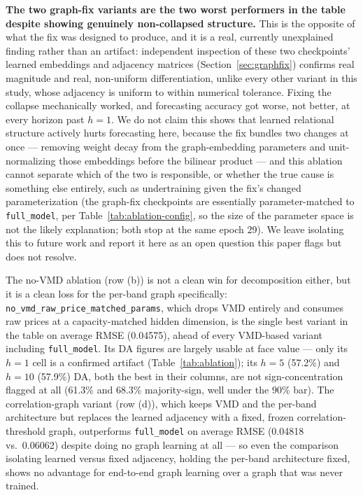 \documentclass[journal]{IEEEtran}
\begin{document}
\textbf{The two graph-fix variants are the two worst performers in the table despite showing genuinely non-collapsed structure.} This is the opposite of what the fix was designed to produce, and it is a real, currently unexplained finding rather than an artifact: independent inspection of these two checkpoints' learned embeddings and adjacency matrices (Section~\ref{sec:graphfix}) confirms real magnitude and real, non-uniform differentiation, unlike every other variant in this study, whose adjacency is uniform to within numerical tolerance. Fixing the collapse mechanically worked, and forecasting accuracy got worse, not better, at every horizon past $h=1$. We do not claim this shows that learned relational structure actively hurts forecasting here, because the fix bundles two changes at once --- removing weight decay from the graph-embedding parameters and unit-normalizing those embeddings before the bilinear product --- and this ablation cannot separate which of the two is responsible, or whether the true cause is something else entirely, such as undertraining given the fix's changed parameterization (the graph-fix checkpoints are essentially parameter-matched to \texttt{full\_model}, per Table~\ref{tab:ablation-config}, so the size of the parameter space is not the likely explanation; both stop at the same epoch 29). We leave isolating this to future work and report it here as an open question this paper flags but does not resolve.

The no-VMD ablation (row (b)) is not a clean win for decomposition either, but it is a clean loss for the per-band graph specifically: \texttt{no\_vmd\_raw\_price\_matched\_params}, which drops VMD entirely and consumes raw prices at a capacity-matched hidden dimension, is the single best variant in the table on average RMSE (0.04575), ahead of every VMD-based variant including \texttt{full\_model}. Its DA figures are largely usable at face value --- only its $h=1$ cell is a confirmed artifact (Table~\ref{tab:ablation}); its $h=5$ (57.2\%) and $h=10$ (57.9\%) DA, both the best in their columns, are not sign-concentration flagged at all (61.3\% and 68.3\% majority-sign, well under the 90\% bar). The correlation-graph variant (row (d)), which keeps VMD and the per-band architecture but replaces the learned adjacency with a fixed, frozen correlation-threshold graph, outperforms \texttt{full\_model} on average RMSE (0.04818 vs.\ 0.06062) despite doing no graph learning at all --- so even the comparison isolating learned versus fixed adjacency, holding the per-band architecture fixed, shows no advantage for end-to-end graph learning over a graph that was never trained.
\end{document}
